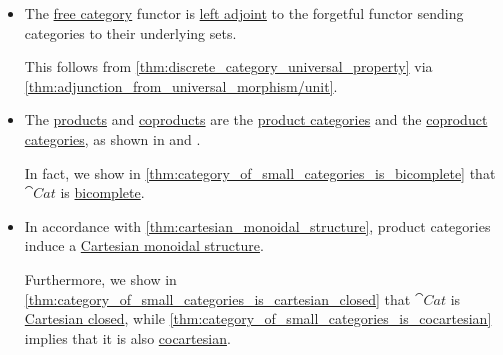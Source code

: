 \begin{remark}
\begin{itemize}
    \item The \hyperref[def:free_category]{free category} functor is \hyperref[def:adjoint_functor]{left adjoint} to the forgetful functor sending categories to their underlying sets.

    This follows from \cref{thm:discrete_category_universal_property} via \cref{thm:adjunction_from_universal_morphism/unit}.

    \item The \hyperref[def:categorical_product]{products} and \hyperref[def:categorical_coproduct]{coproducts} are the \hyperref[def:product_category]{product categories} and the \hyperref[def:coproduct_category]{coproduct categories}, as shown in  and .

    In fact, we show in \cref{thm:category_of_small_categories_is_bicomplete} that \( \cat{Cat} \) is \hyperref[def:bicomplete_category]{bicomplete}.

    \item In accordance with \cref{thm:cartesian_monoidal_structure}, product categories induce a \hyperref[def:cartesian_monoidal_category]{Cartesian monoidal structure}.

    Furthermore, we show in \cref{thm:category_of_small_categories_is_cartesian_closed} that \( \cat{Cat} \) is \hyperref[def:cartesian_closed_category]{Cartesian closed}, while \cref{thm:category_of_small_categories_is_cocartesian} implies that it is also \hyperref[def:cocartesian_monoidal_category]{cocartesian}.
  \end{itemize}
\end{remark}

